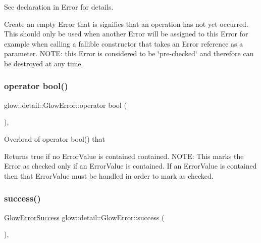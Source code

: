 See declaration in Error for details. 

Create an empty Error that is signifies that an operation has not yet occurred. This should only be used when another Error will be assigned to this Error for example when calling a fallible constructor that takes an Error reference as a parameter. N\+O\+TE\+: this Error is considered to be \char`\"{}pre-\/checked\char`\"{} and therefore can be destroyed at any time. \mbox{\label{classglow_1_1detail_1_1_glow_error_a4a2859d7ac4cd0bd050276d0af7faf4a}} 
\subsubsection{\texorpdfstring{operator bool()}{operator bool()}}
{\footnotesize\ttfamily glow\+::detail\+::\+Glow\+Error\+::operator bool (\begin{DoxyParamCaption}{ }\end{DoxyParamCaption})\hspace{0.3cm}{\ttfamily [inline]}, {\ttfamily [explicit]}}

Overload of operator bool() that \begin{DoxyReturn}{Returns}
true if no Error\+Value is contained contained. N\+O\+TE\+: This marks the Error as checked only if an Error\+Value is contained. If an Error\+Value is contained then that Error\+Value must be handled in order to mark as checked. 
\end{DoxyReturn}
\mbox{\label{classglow_1_1detail_1_1_glow_error_ace73703b37f7e894290547c34927dba7}} 
\subsubsection{\texorpdfstring{success()}{success()}}
{\footnotesize\ttfamily \hyperlink{classglow_1_1detail_1_1_glow_error_success}{Glow\+Error\+Success} glow\+::detail\+::\+Glow\+Error\+::success (\begin{DoxyParamCaption}{ }\end{DoxyParamCaption})\hspace{0.3cm}{\ttfamily [inline]}, {\ttfamily [static]}}



